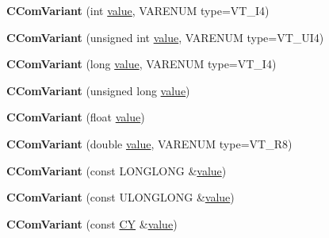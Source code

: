 \begin{DoxyCompactItemize}
{\bfseries C\+Com\+Variant} (int \hyperlink{unionvalue}{value}, V\+A\+R\+E\+N\+UM type=V\+T\+\_\+\+I4)
\item 
\mbox{\label{class_a_t_l_1_1_c_com_variant_afd97ee1ebcd812c4510e39b53ffeb7b0}} 
{\bfseries C\+Com\+Variant} (unsigned int \hyperlink{unionvalue}{value}, V\+A\+R\+E\+N\+UM type=V\+T\+\_\+\+U\+I4)
\item 
\mbox{\label{class_a_t_l_1_1_c_com_variant_a342f72f4cc205d37c6c2a63188950657}} 
{\bfseries C\+Com\+Variant} (long \hyperlink{unionvalue}{value}, V\+A\+R\+E\+N\+UM type=V\+T\+\_\+\+I4)
\item 
\mbox{\label{class_a_t_l_1_1_c_com_variant_a5157e541ba621523808829c29a4b619a}} 
{\bfseries C\+Com\+Variant} (unsigned long \hyperlink{unionvalue}{value})
\item 
\mbox{\label{class_a_t_l_1_1_c_com_variant_ac66bde70a9d67ad8aa25d6210125541f}} 
{\bfseries C\+Com\+Variant} (float \hyperlink{unionvalue}{value})
\item 
\mbox{\label{class_a_t_l_1_1_c_com_variant_ade2e739ba7797267721180fea3d6465c}} 
{\bfseries C\+Com\+Variant} (double \hyperlink{unionvalue}{value}, V\+A\+R\+E\+N\+UM type=V\+T\+\_\+\+R8)
\item 
\mbox{\label{class_a_t_l_1_1_c_com_variant_a00a92e84e0b7ed9daf0fe89213c8483d}} 
{\bfseries C\+Com\+Variant} (const L\+O\+N\+G\+L\+O\+NG \&\hyperlink{unionvalue}{value})
\item 
\mbox{\label{class_a_t_l_1_1_c_com_variant_a02a1ef664ff631791a394e71c9216521}} 
{\bfseries C\+Com\+Variant} (const U\+L\+O\+N\+G\+L\+O\+NG \&\hyperlink{unionvalue}{value})
\item 
\mbox{\label{class_a_t_l_1_1_c_com_variant_a0915897d2c0079fb5f1930f124356744}} 
{\bfseries C\+Com\+Variant} (const \hyperlink{uniontag_c_y}{CY} \&\hyperlink{unionvalue}{value})
\item 
\mbox{\label{class_a_t_l_1_1_c_com_variant_aac95db97d4a01bfb25bd26e8074df534}} 

\end{DoxyCompactItemize}
